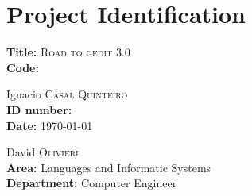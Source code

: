 
\chapter{Project Identification}

{\bf Title:} \textsc{Road to gedit 3.0}\\
{\bf Code:} %

 Ignacio \textsc{Casal Quinteiro}\\
{\bf ID number:} \\ %
{\bf Date:} \today

 David \textsc{Olivieri}\\
{\bf Area:} Languages and Informatic Systems\\
{\bf Department:} Computer Engineer
